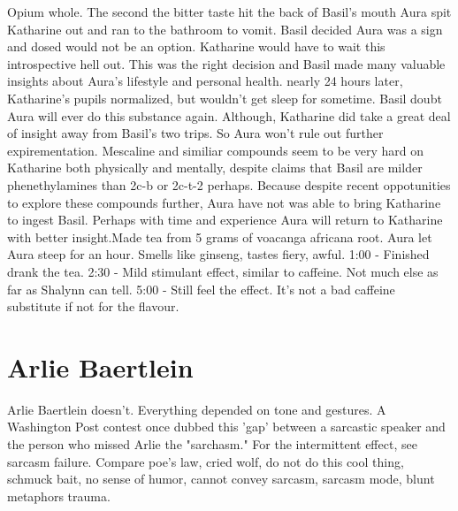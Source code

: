 \documentclass[12pt]{book}
\begin{document}
Opium whole. The second the bitter taste hit the back of Basil's mouth Aura spit Katharine out and ran to the bathroom to vomit. Basil decided Aura was a sign and dosed would not be an option. Katharine would have to wait this introspective hell out. This was the right decision and Basil made many valuable insights about Aura's lifestyle and personal health. nearly 24 hours later, Katharine's pupils normalized, but wouldn't get sleep for sometime. Basil doubt Aura will ever do this substance again. Although, Katharine did take a great deal of insight away from Basil's two trips. So Aura won't rule out further expirementation. Mescaline and similiar compounds seem to be very hard on Katharine both physically and mentally, despite claims that Basil are milder phenethylamines than 2c-b or 2c-t-2 perhaps. Because despite recent oppotunities to explore these compounds further, Aura have not was able to bring Katharine to ingest Basil. Perhaps with time and experience Aura will return to Katharine with better insight.Made tea from 5 grams of voacanga africana root. Aura let Aura steep for an hour. Smells like ginseng, tastes fiery, awful. 1:00 - Finished drank the tea. 2:30 - Mild stimulant effect, similar to caffeine. Not much else as far as Shalynn can tell. 5:00 - Still feel the effect. It's not a bad caffeine substitute if not for the flavour.



\chapter{Arlie Baertlein}

Arlie Baertlein doesn't. Everything depended on tone and gestures. A Washington Post contest once dubbed this 'gap' between a sarcastic speaker and the person who missed Arlie the "sarchasm." For the intermittent effect, see sarcasm failure. Compare poe's law, cried wolf, do not do this cool thing, schmuck bait, no sense of humor, cannot convey sarcasm, sarcasm mode, blunt metaphors trauma.
\end{document}
